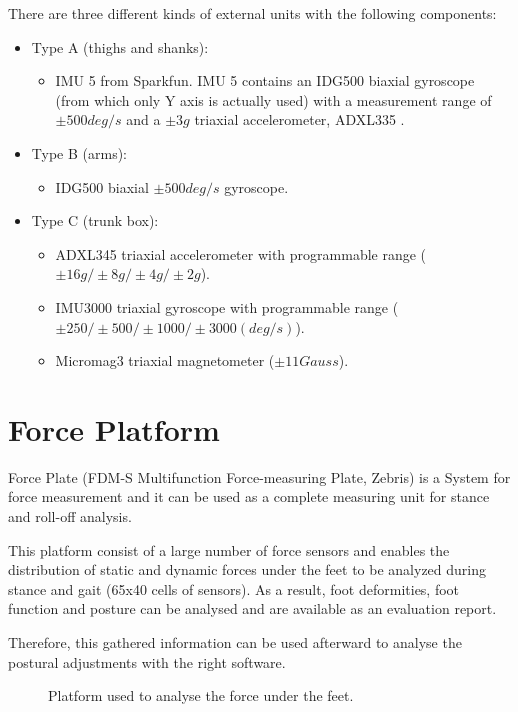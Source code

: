 There are three different kinds of external units with the following components:
\begin{itemize}
	\item Type A (thighs and shanks): 
	\begin{itemize}
		\item IMU 5 from Sparkfun. IMU 5 contains an IDG500  biaxial gyroscope (from which only Y axis is actually used) with a measurement range of $\pm500deg/s$ and a $\pm3g$ triaxial accelerometer, ADXL335 .
	\end{itemize}
	\item Type B (arms):
	\begin{itemize}
		\item IDG500  biaxial $\pm500deg/s$ gyroscope.
	\end{itemize}
	\item Type C (trunk box):
	\begin{itemize}
		\item ADXL345  triaxial accelerometer with programmable range ($\pm16g/\pm8g/\pm4g/\pm2g$).
		\item IMU3000 triaxial gyroscope with programmable range ($\pm250/\pm500/\pm1000/\pm3000 (deg/s)$).
		\item Micromag3  triaxial magnetometer ($\pm11Gauss$).
	\end{itemize}
\end{itemize}


\section{Force Platform}
Force Plate (FDM-S Multifunction Force-measuring Plate, Zebris) is a System for force measurement and it can be used as a complete measuring unit for stance and roll-off analysis. \cite{forceplate}

This platform consist of a large number of force sensors and enables the distribution of static and dynamic forces under the feet to be analyzed during stance and gait (65x40 cells of sensors). As a result, foot deformities, foot function and posture can be analysed and are available as an evaluation report. \cite{forceplate}

Therefore, this gathered information can be used afterward to analyse the postural adjustments with the right software.

\begin{figure}[H]
	\centering
	\caption{Platform used to analyse the force under the feet.}
	\label{fig:arte1}
\end{figure}


